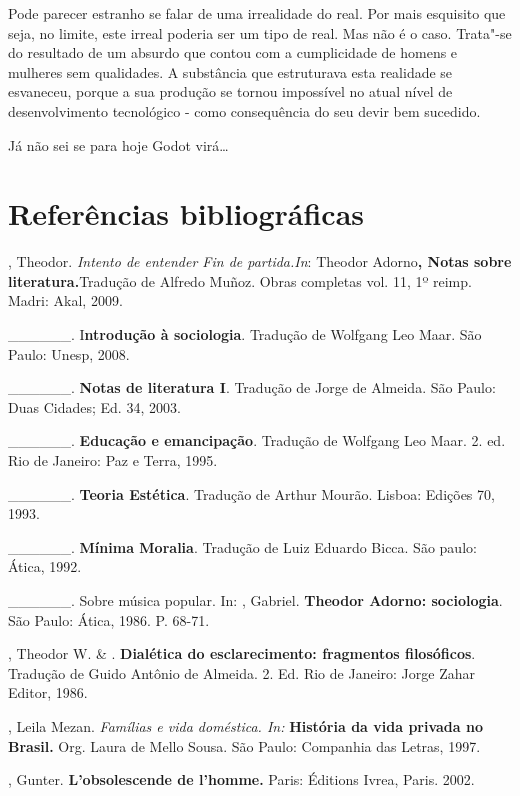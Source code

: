 Pode parecer estranho se falar de uma irrealidade do real. Por mais
esquisito que seja, no limite, este irreal poderia ser um tipo de real.
Mas não é o caso. Trata"-se do resultado de um absurdo que contou com a
cumplicidade de homens e mulheres sem qualidades. A substância que
estruturava esta realidade se esvaneceu, porque a sua produção se tornou
impossível no atual nível de desenvolvimento tecnológico - como
consequência do seu devir bem sucedido.

Já não sei se para hoje Godot virá\ldots{}

\chapter{Referências bibliográficas}


\begin{Parskip}
, Theodor. \emph{Intento de entender Fin de partida.In}: Theodor
Adorno\textbf{, Notas sobre literatura.}Tradução de Alfredo Muñoz. Obras
completas vol. 11, 1º reimp. Madri: Akal, 2009.

\_\_\_\_\_\_. I\textbf{ntrodução à sociologia}. Tradução de Wolfgang Leo
Maar. São Paulo: Unesp, 2008.

\_\_\_\_\_\_. \textbf{Notas de literatura I}. Tradução de Jorge de
Almeida. São Paulo: Duas Cidades; Ed. 34, 2003.

\_\_\_\_\_\_. \textbf{Educação e emancipação}. Tradução de Wolfgang Leo
Maar. 2. ed. Rio de Janeiro: Paz e Terra, 1995.

\_\_\_\_\_\_. \textbf{Teoria Estética}. Tradução de Arthur Mourão.
Lisboa: Edições 70, 1993.

\_\_\_\_\_\_. \textbf{Mínima Moralia}. Tradução de Luiz Eduardo Bicca.
São paulo: Ática, 1992.

\_\_\_\_\_\_. Sobre música popular. In: , Gabriel. \textbf{Theodor
Adorno: sociologia}. São Paulo: Ática, 1986. P. 68-71.

, Theodor W. \& . \textbf{Dialética do esclarecimento:
fragmentos filosóficos}. Tradução de Guido Antônio de Almeida. 2. Ed.
Rio de Janeiro: Jorge Zahar Editor, 1986.

, Leila Mezan. \emph{Famílias e vida doméstica. In:}
\textbf{História da vida privada no Brasil.} Org. Laura de Mello Sousa.
São Paulo: Companhia das Letras, 1997.

, Gunter. \textbf{L'obsolescende de l'homme.} Paris: Éditions
Ivrea, Paris. 2002.


\end{Parskip}
